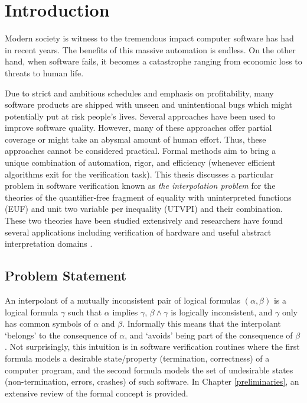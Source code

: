 \chapter{Introduction}

Modern society is witness to the tremendous impact computer software 
has had in recent years. The benefits of this massive 
automation is endless. On the other hand, when software 
fails, it becomes a catastrophe ranging from economic loss
to threats to human life. 

Due to strict and ambitious schedules and emphasis 
on profitability, 
many software products
are shipped with unseen and unintentional 
bugs which might potentially put
at risk people's lives. Several approaches have been 
used to improve software quality. However, many of these approaches 
offer partial coverage or might take an abysmal amount 
of human effort. Thus, these approaches cannot be 
considered practical. 
Formal methods aim to bring a unique combination 
of automation, rigor, and 
efficiency (whenever efficient algorithms exit 
for the verification task). 
This thesis discusses a particular problem in 
software verification
known as \emph{the interpolation problem} for 
the theories of the quantifier-free
fragment of equality with uninterpreted functions 
(EUF) and unit two variable per
inequality (UTVPI) and their combination. These two 
theories have been 
studied extensively and researchers have found 
several applications including verification of 
hardware \cite{dilleuf} and useful 
abstract interpretation domains 
\cite{journals/corr/abs-cs-0703084}.

\section{Problem Statement}

An interpolant of a mutually inconsistent
pair of logical formulas $(\alpha, \beta)$ 
is a logical formula $\gamma$
such that $\alpha$ implies $\gamma$, $\beta \land \gamma$ is logically
inconsistent, and $\gamma$ only has common symbols of $\alpha$ and $\beta$.
Informally this means that the 
interpolant `belongs' to the consequence of $\alpha$, 
and `avoids' being part of the consequence of $\beta$. 
Not surprisingly, this intuition is in software verification 
routines where the first formula models a desirable state/property
(termination, correctness) of a computer program, and the second 
formula models the set of undesirable states (non-termination, 
errors, crashes) of such software. In Chapter 
\ref{preliminaries}, an extensive review of the formal concept 
is provided.

